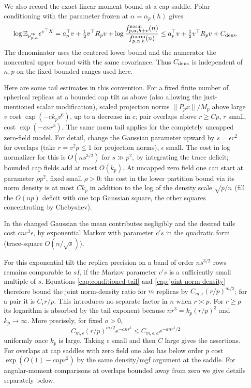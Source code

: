 We also record the exact linear moment bound at a cap saddle. Polar
conditioning with the parameter frozen at \(\alpha=\alpha_p(h)\) gives
\begin{equation}\label{cap:frozen-mgf}
 \log\mathbb E_{\mu_{p,h}^{\rm sp}}e^{v^\top X}
 =a_p^\top v+\tfrac12v^\top R_pv+
   \log\frac{f_{p,\alpha,h+v}^{\rm norm}(n)}
                 {f_{p,\alpha,h}^{\rm norm}(n)}
 \le a_p^\top v+\tfrac12v^\top R_pv+C_{\rm dens}.
\end{equation}
The denominator uses the centered lower bound and the numerator the
noncentral upper bound with the same covariance. Thus \(C_{\rm dens}\)
is independent of \(n,p\) on the fixed bounded ranges used here.

Here are some tail estimates in this convention. For a fixed finite number of
spherical replicas at a bounded cap tilt as above (also allowing the
just-mentioned scalar modification), scaled projection norms \(\|P_p x\|/M_p\)
above large \(v\) cost \(\exp(-c k_p v^6)\), up to a decrease in \(c\); pair
overlaps above \(r\ge C p\), \(r\) small, cost \(\exp(-c n r^3)\). The same
norm tail applies for the completely uncapped zero-field model. For detail,
change the Gaussian parameter upward by \(s=\epsilon r^2\) for overlaps (take
\(r=v^2p\le1\) for projection norms), \(\epsilon\) small. The cost in log
normalizer for this is \(O(n s^{3/2})\) for \(s\gg p^2\), by integrating the
trace deficit; bounded cap fields add at most \(O(k_p)\). At uncapped zero
field one can start at parameter \(\rho p^2\), fixed small \(\rho>0\): the
cost in the lower partition bound via its norm density is at most \(C k_p\) in
addition to the log of the density scale \(\sqrt{p/n}\) (fill the \(O(np)\)
deficit with one top Gaussian square, the other squares concentrating by
Chebyshev).

In the changed Gaussian the mean contributes negligibly and the desired tails
cost \(c n r^3\epsilon\), by exponential Markov with parameter \(c's\) in the
quadratic form (trace-square \(O(n/\sqrt s)\)).

For this exponential tilt the replica precision on a band of order
\(ns^{3/2}\) rows remains comparable to \(sI\), if the Markov parameter
\(c's\) is a sufficiently small multiple of \(s\). Equations
\eqref{cap:conditioned-tail} and \eqref{cap:joint-norm-density} therefore
bound the joint norm-density ratio for \(m\) replicas by
\(C_{m,\epsilon}(r/p)^{m/2}\); for a pair it is \(C_\epsilon r/p\).
This introduces no separate factor in \(n\) when \(r\asymp p\).
For \(r\ge p\) its logarithm is absorbed by the tail exponent because
\(nr^3=k_p(r/p)^3\) and \(k_p\to\infty\). More precisely, for fixed \(a>0\),
\[
 C_{m,\epsilon}(r/p)^{m/2}e^{-a nr^3}
 \le C_{m,\epsilon,a}e^{-a nr^3/2}
\]
uniformly once \(k_p\) is large. Taking \(\epsilon\) small and then \(C\)
large gives the assertions. For overlaps at cap saddles with
zero field one also has below order \(p\) cost \(\exp(O(1)-c n p r^2)\) by the
same density/mgf argument at the saddle. For angular-moment comparisons at
overlaps bounded away from zero we give details separately below.

